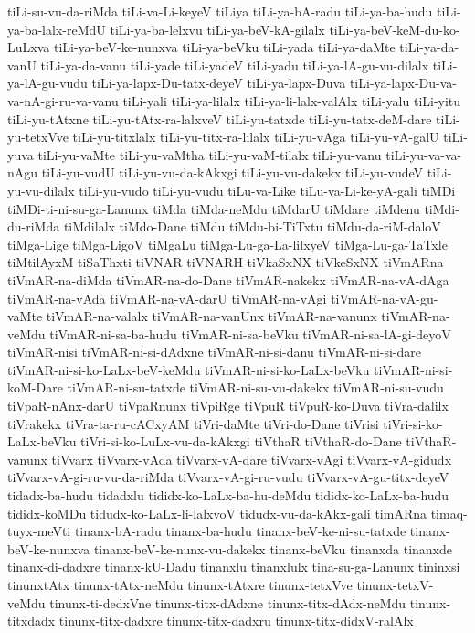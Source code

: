 {tiLi-su-vu-da-riMda
tiLi-va-Li-keyeV
tiLiya
tiLi-ya-bA-radu
tiLi-ya-ba-hudu
tiLi-ya-ba-lalx-reMdU
tiLi-ya-ba-lelxvu
tiLi-ya-beV-kA-gilalx
tiLi-ya-beV-keM-du-ko-LuLxva
tiLi-ya-beV-ke-nunxva
tiLi-ya-beVku
tiLi-yada
tiLi-ya-daMte
tiLi-ya-da-vanU
tiLi-ya-da-vanu
tiLi-yade
tiLi-yadeV
tiLi-yadu
tiLi-ya-lA-gu-vu-dilalx
tiLi-ya-lA-gu-vudu
tiLi-ya-lapx-Du-tatx-deyeV
tiLi-ya-lapx-Duva
tiLi-ya-lapx-Du-va-va-nA-gi-ru-va-vanu
tiLi-yali
tiLi-ya-lilalx
tiLi-ya-li-lalx-valAlx
tiLi-yalu
tiLi-yitu
tiLi-yu-tAtxne
tiLi-yu-tAtx-ra-lalxveV
tiLi-yu-tatxde
tiLi-yu-tatx-deM-dare
tiLi-yu-tetxVve
tiLi-yu-titxlalx
tiLi-yu-titx-ra-lilalx
tiLi-yu-vAga
tiLi-yu-vA-galU
tiLi-yuva
tiLi-yu-vaMte
tiLi-yu-vaMtha
tiLi-yu-vaM-tilalx
tiLi-yu-vanu
tiLi-yu-va-va-nAgu
tiLi-yu-vudU
tiLi-yu-vu-da-kAkxgi
tiLi-yu-vu-dakekx
tiLi-yu-vudeV
tiLi-yu-vu-dilalx
tiLi-yu-vudo
tiLi-yu-vudu
tiLu-va-Like
tiLu-va-Li-ke-yA-gali
tiMDi
tiMDi-ti-ni-su-ga-Lanunx
tiMda
tiMda-neMdu
tiMdarU
tiMdare
tiMdenu
tiMdi-du-riMda
tiMdilalx
tiMdo-Dane
tiMdu
tiMdu-bi-TiTxtu
tiMdu-da-riM-daloV
tiMga-Lige
tiMga-LigoV
tiMgaLu
tiMga-Lu-ga-La-lilxyeV
tiMga-Lu-ga-TaTxle
tiMtilAyxM
tiSaThxti
tiVNAR
tiVNARH
tiVkaSxNX
tiVkeSxNX
tiVmARna
tiVmAR-na-diMda
tiVmAR-na-do-Dane
tiVmAR-nakekx
tiVmAR-na-vA-dAga
tiVmAR-na-vAda
tiVmAR-na-vA-darU
tiVmAR-na-vAgi
tiVmAR-na-vA-gu-vaMte
tiVmAR-na-valalx
tiVmAR-na-vanUnx
tiVmAR-na-vanunx
tiVmAR-na-veMdu
tiVmAR-ni-sa-ba-hudu
tiVmAR-ni-sa-beVku
tiVmAR-ni-sa-lA-gi-deyoV
tiVmAR-nisi
tiVmAR-ni-si-dAdxne
tiVmAR-ni-si-danu
tiVmAR-ni-si-dare
tiVmAR-ni-si-ko-LaLx-beV-keMdu
tiVmAR-ni-si-ko-LaLx-beVku
tiVmAR-ni-si-koM-Dare
tiVmAR-ni-su-tatxde
tiVmAR-ni-su-vu-dakekx
tiVmAR-ni-su-vudu
tiVpaR-nAnx-darU
tiVpaRnunx
tiVpiRge
tiVpuR
tiVpuR-ko-Duva
tiVra-dalilx
tiVrakekx
tiVra-ta-ru-cACxyAM
tiVri-daMte
tiVri-do-Dane
tiVrisi
tiVri-si-ko-LaLx-beVku
tiVri-si-ko-LuLx-vu-da-kAkxgi
tiVthaR
tiVthaR-do-Dane
tiVthaR-vanunx
tiVvarx
tiVvarx-vAda
tiVvarx-vA-dare
tiVvarx-vAgi
tiVvarx-vA-gidudx
tiVvarx-vA-gi-ru-vu-da-riMda
tiVvarx-vA-gi-ru-vudu
tiVvarx-vA-gu-titx-deyeV
tidadx-ba-hudu
tidadxlu
tididx-ko-LaLx-ba-hu-deMdu
tididx-ko-LaLx-ba-hudu
tididx-koMDu
tidudx-ko-LaLx-li-lalxvoV
tidudx-vu-da-kAkx-gali
timARna
timaq-tuyx-meVti
tinanx-bA-radu
tinanx-ba-hudu
tinanx-beV-ke-ni-su-tatxde
tinanx-beV-ke-nunxva
tinanx-beV-ke-nunx-vu-dakekx
tinanx-beVku
tinanxda
tinanxde
tinanx-di-dadxre
tinanx-kU-Dadu
tinanxlu
tinanxlulx
tina-su-ga-Lanunx
tininxsi
tinunxtAtx
tinunx-tAtx-neMdu
tinunx-tAtxre
tinunx-tetxVve
tinunx-tetxV-veMdu
tinunx-ti-dedxVne
tinunx-titx-dAdxne
tinunx-titx-dAdx-neMdu
tinunx-titxdadx
tinunx-titx-dadxre
tinunx-titx-dadxru
tinunx-titx-didxV-ralAlx
}
